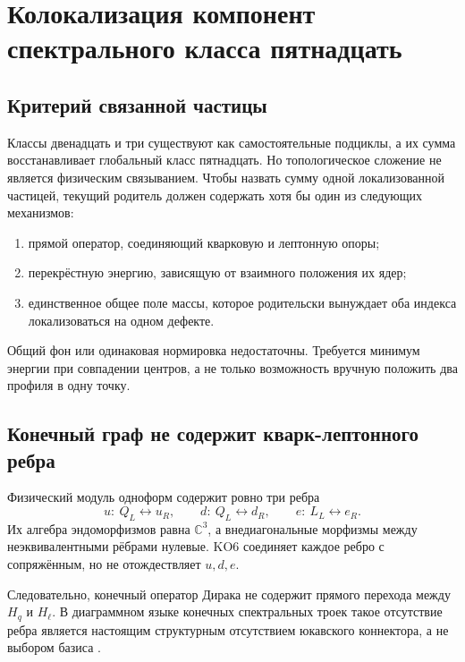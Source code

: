 \chapter{Колокализация компонент спектрального класса пятнадцать}
\label{ch:v6-spectral-transition-component-colocalization-gate}

\section{Критерий связанной частицы}

Классы двенадцать и три существуют как самостоятельные подциклы, а их
сумма восстанавливает глобальный класс пятнадцать. Но топологическое
сложение не является физическим связыванием. Чтобы назвать сумму одной
локализованной частицей, текущий родитель должен содержать хотя бы один из
следующих механизмов:
\begin{enumerate}
 \item прямой оператор, соединяющий кварковую и лептонную опоры;
 \item перекрёстную энергию, зависящую от взаимного положения их ядер;
 \item единственное общее поле массы, которое родительски вынуждает оба
 индекса локализоваться на одном дефекте.
\end{enumerate}

Общий фон или одинаковая нормировка недостаточны. Требуется минимум
энергии при совпадении центров, а не только возможность вручную положить
два профиля в одну точку.

\section{Конечный граф не содержит кварк-лептонного ребра}

Физический модуль одноформ содержит ровно три ребра
\begin{equation}
 u:\ Q_L\leftrightarrow u_R,
 \qquad
 d:\ Q_L\leftrightarrow d_R,
 \qquad
 e:\ L_L\leftrightarrow e_R.
\end{equation}
Их алгебра эндоморфизмов равна $\mathbb C^3$, а внедиагональные
морфизмы между неэквивалентными рёбрами нулевые. KO6 соединяет каждое
ребро с сопряжённым, но не отождествляет $u,d,e$.

Следовательно, конечный оператор Дирака не содержит прямого перехода
между $H_q$ и $H_\ell$. В диаграммном языке конечных спектральных троек
такое отсутствие ребра является настоящим структурным отсутствием
юкавского коннектора, а не выбором базиса
\cite{colocalization-krajewski1998,
colocalization-chamseddine-connes-marcolli2007}.

